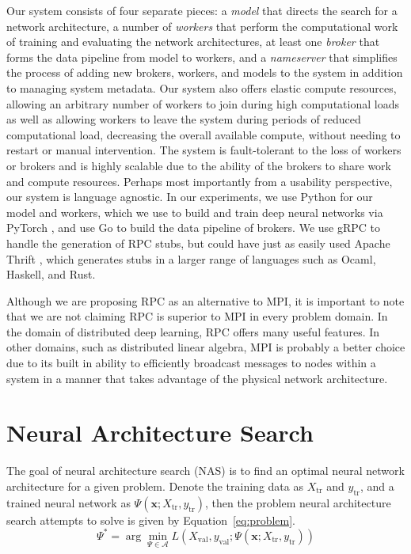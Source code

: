 \documentclass[conference]{IEEEtran}
\begin{document}
Our system consists of four separate pieces: a \emph{model} that directs the
search for a network architecture, a number of \emph{workers} that perform the
computational work of training and evaluating the network architectures, at
least one \emph{broker} that forms the data pipeline from model to workers, and
a \emph{nameserver} that simplifies the process of adding new brokers, workers,
and models to the system in addition to managing system metadata. Our system
also offers elastic compute resources, allowing an arbitrary number of workers
to join during high computational loads as well as allowing workers to leave the
system during periods of reduced computational load, decreasing the overall
available compute, without needing to restart or manual intervention.  The
system is fault-tolerant to the loss of workers or brokers and is highly
scalable due to the ability of the brokers to share work and compute
resources. Perhaps most importantly from a usability perspective, our system is
language agnostic. In our experiments, we use Python for our model and workers,
which we use to build and train deep neural networks via PyTorch
\cite{paszke2017automatic}, and use Go to build the data pipeline of brokers. We
use gRPC \cite{Wang:1993:GCC:155870.155881} to handle the generation of RPC
stubs, but could have just as easily used Apache Thrift \cite{Slee2007}, which
generates stubs in a larger range of languages such as Ocaml, Haskell, and Rust.

Although we are proposing RPC as an alternative to MPI, it is important to note
that we are not claiming RPC is superior to MPI in every problem domain. In the
domain of distributed deep learning, RPC offers many useful features. In other
domains, such as distributed linear algebra, MPI is probably a better choice due
to its built in ability to efficiently broadcast messages to nodes within a
system in a manner that takes advantage of the physical network architecture.

\section{Neural Architecture Search}
The goal of neural architecture search (NAS) is to find an optimal neural
network architecture for a given problem. Denote the training data as
$X_{\text{tr}}$ and $y_{\text{tr}}$, and a trained neural network as
$\Psi(\mathbf{x}; X_{\text{tr}}, y_{\text{tr}})$, then the problem
neural architecture search attempts to solve is given by
Equation~\eqref{eq:problem}.
\begin{equation}\label{eq:problem}
\Psi^* = \arg\min_{\Psi \in \mathcal{A}} L(X_{\text{val}}, y_{\text{val}}; \Psi(\mathbf{x}; X_{\text{tr}}, y_{\text{tr}}))
\end{equation}
\end{document}
